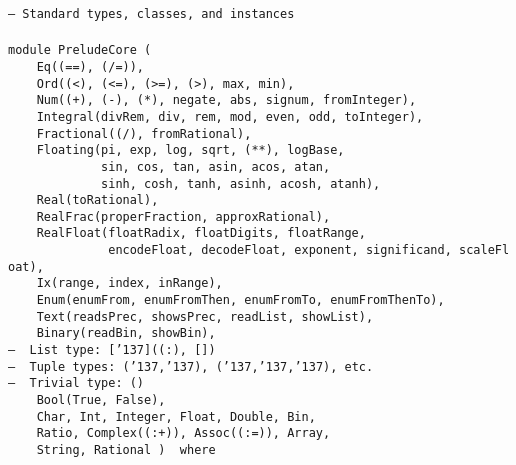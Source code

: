 \noindent\bprogB
\mbox{\tt --\ Standard\ types,\ classes,\ and\ instances}\\
\mbox{\tt }\\[-8pt]
\mbox{\tt module\ PreludeCore\ (}\\
\mbox{\tt \ \ \ \ Eq((==),\ (/=)),}\\
\mbox{\tt \ \ \ \ Ord((<),\ (<=),\ (>=),\ (>),\ max,\ min),}\\
\mbox{\tt \ \ \ \ Num((+),\ (-),\ (*),\ negate,\ abs,\ signum,\ fromInteger),}\\
\mbox{\tt \ \ \ \ Integral(divRem,\ div,\ rem,\ mod,\ even,\ odd,\ toInteger),}\\
\mbox{\tt \ \ \ \ Fractional((/),\ fromRational),}\\
\mbox{\tt \ \ \ \ Floating(pi,\ exp,\ log,\ sqrt,\ (**),\ logBase,}\\
\mbox{\tt \ \ \ \ \ \ \ \ \ \ \ \ \ sin,\ cos,\ tan,\ asin,\ acos,\ atan,}\\
\mbox{\tt \ \ \ \ \ \ \ \ \ \ \ \ \ sinh,\ cosh,\ tanh,\ asinh,\ acosh,\ atanh),}\\
\mbox{\tt \ \ \ \ Real(toRational),}\\
\mbox{\tt \ \ \ \ RealFrac(properFraction,\ approxRational),}\\
\mbox{\tt \ \ \ \ RealFloat(floatRadix,\ floatDigits,\ floatRange,}\\
\mbox{\tt \ \ \ \ \ \ \ \ \ \ \ \ \ \ encodeFloat,\ decodeFloat,\ exponent,\ significand,\ scaleFloat),}\\
\mbox{\tt \ \ \ \ Ix(range,\ index,\ inRange),}\\
\mbox{\tt \ \ \ \ Enum(enumFrom,\ enumFromThen,\ enumFromTo,\ enumFromThenTo),}\\
\mbox{\tt \ \ \ \ Text(readsPrec,\ showsPrec,\ readList,\ showList),}\\
\mbox{\tt \ \ \ \ Binary(readBin,\ showBin),}\\
\mbox{\tt --\ \ List\ type:\ [{\char'137}]((:),\ [])}\\
\mbox{\tt --\ \ Tuple\ types:\ ({\char'137},{\char'137}),\ ({\char'137},{\char'137},{\char'137}),\ etc.}\\
\mbox{\tt --\ \ Trivial\ type:\ ()\ }\\
\mbox{\tt \ \ \ \ Bool(True,\ False),}\\
\mbox{\tt \ \ \ \ Char,\ Int,\ Integer,\ Float,\ Double,\ Bin,}\\
\mbox{\tt \ \ \ \ Ratio,\ Complex((:+)),\ Assoc((:=)),\ Array,}\\
\mbox{\tt \ \ \ \ String,\ Rational\ )\ \ where}
